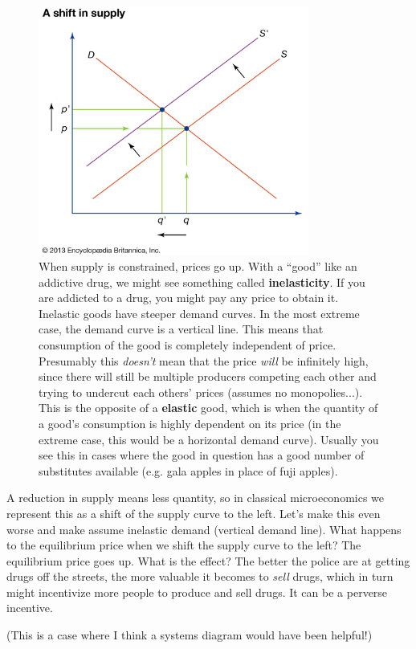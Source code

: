 \documentclass[11pt]{article}
\begin{document}
\begin{figure}[h]
    \centering
    \includegraphics*[width=3.5in]{supplyshift.png}
    \caption{When supply is constrained, prices go up. With a ``good'' like an addictive drug, we might see something called {\bf inelasticity}. If you are addicted to a drug, you might pay any price to obtain it. Inelastic goods have steeper demand curves. In the most extreme case, the demand curve is a vertical line. This means that consumption of the good is completely independent of price. Presumably this {\it doesn't} mean that the price {\it will} be infinitely high, since there will still be multiple producers competing each other and trying to undercut each others' prices (assumes no monopolies...). This is the opposite of a {\bf elastic} good, which is when the quantity of a good's consumption is highly dependent on its price (in the extreme case, this would be a horizontal demand curve). Usually you see this in cases where the good in question has a good number of substitutes available (e.g. gala apples in place of fuji apples). }
    \label{fig:sshift}
\end{figure}

A reduction in supply means less quantity, so in classical microeconomics we represent this as a shift of the supply curve to the left. Let's make this even worse and make assume inelastic demand (vertical demand line). What happens to the equilibrium price when we shift the supply curve to the left? The equilibrium price goes up. What is the effect? The better the police are at getting drugs off the streets, the more valuable it becomes to {\it sell} drugs, which in turn might incentivize more people to produce and sell drugs. It can be a perverse incentive. 

(This is a case where I think a systems diagram would have been helpful!)
\end{document}

